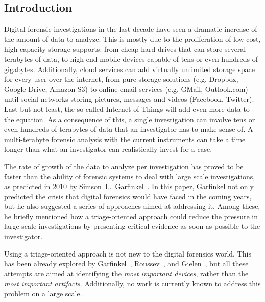 \documentclass[twoside]{article}
\begin{document}
\begin{multicols}{2} %

\section{Introduction}


\lettrine[nindent=0em,lines=3]{D}igital forensic investigations in the last decade
    have seen a dramatic increase of the amount of data to analyze. This is
    mostly due to the proliferation of low cost, high-capacity storage supports:
    from cheap hard drives that can store several terabytes of data, to
    high-end mobile devices capable of tens or even hundreds of gigabytes.
    Additionally, cloud services can add virtually unlimited storage space for
    every user over the internet, from pure storage solutions (e.g. Dropbox,
    Google Drive, Amazon S3) to online email services (e.g. GMail, Outlook.com)
    until social networks storing pictures, messages and videos (Facebook,
    Twitter). Last but not least, the so-called Internet of Things will add even
    more data to the equation.
    As a consequence of this, a single investigation can involve tens or even
    hundreds of terabytes of data that an investigator has to make sense of.
    A multi-terabyte forensic analysis with the current instruments can take
    a time longer than what an investigator can realistically invest for a
    case.

    The rate of growth of the data to analyze per investigation has proved to be
    faster than the
    ability of forensic systems to deal with large scale investigations, as
    predicted in 2010 by Simson~L.~Garfinkel~\cite{garfinkel2010}. In this
    paper, Garfinkel not only predicted the crisis that digital forensics would
    have faced in the coming years, but he also suggested a series of approaches
    aimed at addressing it.
    Among these, he briefly mentioned how a triage-oriented approach
    could reduce the pressure in large scale investigations by presenting
    critical evidence as soon as possible to the investigator.

    Using a triage-oriented approach is not new to the digital forensics world.
    This has been already explored by Garfinkel~\cite{garfinkel2013},
    Roussev~\cite{roussev2013}, and Gielen~\cite{gielen2014}, but all
    these attempts are aimed at identifying the \emph{most important devices},
    rather than the \emph{most important artifacts}.
    Additionally, no work is currently known to address this problem on a large
    scale.


\end{multicols}
\end{document}

